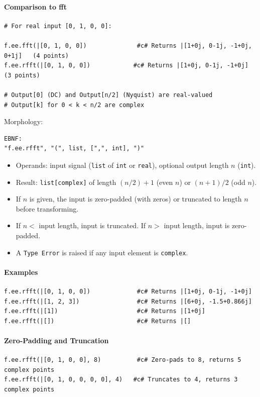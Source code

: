 \paragraph{Comparison to fft}
\begin{verbatim}
# For real input [0, 1, 0, 0]:

f.ee.fft(|[0, 1, 0, 0])              #c# Returns |[1+0j, 0-1j, -1+0j, 0+1j]   (4 points)
f.ee.rfft(|[0, 1, 0, 0])            #c# Returns |[1+0j, 0-1j, -1+0j]          (3 points)

# Output[0] (DC) and Output[n/2] (Nyquist) are real-valued
# Output[k] for 0 < k < n/2 are complex
\end{verbatim}

Morphology:
\begin{verbatim}
EBNF:
"f.ee.rfft", "(", list, [",", int], ")"
\end{verbatim}
\begin{itemize}
\item Operands: input signal (\texttt{list} of \texttt{int} or \texttt{real}), optional output length $n$ (\texttt{int}).
\item Result: \texttt{list[complex]} of length $(n/2)+1$ (even $n$) or $(n+1)/2$ (odd $n$).
\item If $n$ is given, the input is zero-padded (with zeros) or truncated to length $n$ before transforming.
\item If $n < $ input length, input is truncated. If $n > $ input length, input is zero-padded.
\item A \texttt{Type Error} is raised if any input element is \texttt{complex}.
\end{itemize}

\paragraph{Examples}
\begin{verbatim}
f.ee.rfft(|[0, 1, 0, 0])             #c# Returns |[1+0j, 0-1j, -1+0j]
f.ee.rfft(|[1, 2, 3])                #c# Returns |[6+0j, -1.5+0.866j]
f.ee.rfft(|[1])                      #c# Returns |[1+0j]
f.ee.rfft(|[])                       #c# Returns |[]
\end{verbatim}

\paragraph{Zero-Padding and Truncation}
\begin{verbatim}
f.ee.rfft(|[0, 1, 0, 0], 8)          #c# Zero-pads to 8, returns 5 complex points
f.ee.rfft(|[0, 1, 0, 0, 0, 0], 4)   #c# Truncates to 4, returns 3 complex points
\end{verbatim}

